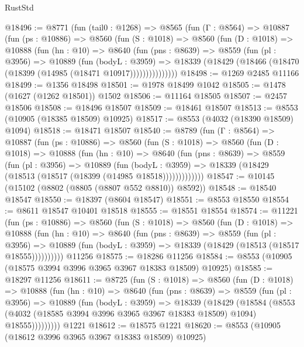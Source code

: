 \begin{lexlean}{RustStd}
\begin{coremodule}
@18496 := @8771
    (fun (tail0 : @1268) =>
    @8565
      (fun (Γ : @8564) =>
      @10887
        (fun (ps : @10886) =>
        @8560
          (fun (S : @1018) =>
          @8560
            (fun (D : @1018) =>
            @10888
              (fun (hn : @10) =>
              @8640
                (fun (pns : @8639) =>
                @8559
                  (fun (pl : @3956) =>
                  @10889
                    (fun (bodyL : @3959) =>
                    @18339 (@18429 (@18466 (@18470 (@18399 (@14985 (@18471 @10917)))))))))))))))
@18498 := @1269 @2485 @11166
@18499 := @1356 @18498
@18501 := @1978 @18499 @1042
@18505 := @1478 (@1627 (@1262 @18501)) @1502
@18506 := @11164 @18505
@18507 := @2457 @18506
@18508 := @18496 @18507
@18509 := @18461 @18507
@18513 := @8553 (@10905 (@18385 @18509) @10925)
@18517 := @8553 (@4032 (@18390 @18509) @1094)
@18518 := @18471 @18507
@18540 := @8789
    (fun (Γ : @8564) =>
    @10887
      (fun (ps : @10886) =>
      @8560
        (fun (S : @1018) =>
        @8560
          (fun (D : @1018) =>
          @10888
            (fun (hn : @10) =>
            @8640
              (fun (pns : @8639) =>
              @8559
                (fun (pl : @3956) =>
                @10889
                  (fun (bodyL : @3959) =>
                  @18339 (@18429 (@18513 (@18517 (@18399 (@14985 @18518)))))))))))))
@18547 := @10145 (@15102 (@8802 (@8805 (@8807 @552 @8810)) @8592))
@18548 := @18540 @18547
@18550 := @18397 (@8604 @18547)
@18551 := @8553 @18550
@18554 := @8611 @18547 @10401 @18518
@18555 := @18551 @18554
@18574 := @11221
    (fun (ps : @10886) =>
    @8560
      (fun (S : @1018) =>
      @8560
        (fun (D : @1018) =>
        @10888
          (fun (hn : @10) =>
          @8640
            (fun (pns : @8639) =>
            @8559
              (fun (pl : @3956) =>
              @10889 (fun (bodyL : @3959) => @18339 (@18429 (@18513 (@18517 @18555))))))))))
    @11256
@18575 := @18286 @11256
@18584 := @8553 (@10905 (@18575 @3994 @3996 @3965 @3967 @18383 @18509) @10925)
@18585 := @18297 @11256
@18611 := @8725
    (fun (S : @1018) =>
    @8560
      (fun (D : @1018) =>
      @10888
        (fun (hn : @10) =>
        @8640
          (fun (pns : @8639) =>
          @8559
            (fun (pl : @3956) =>
            @10889
              (fun (bodyL : @3959) =>
              @18339
                (@18429
                  (@18584
                    (@8553
                      (@4032 (@18585 @3994 @3996 @3965 @3967 @18383 @18509) @1094)
                      @18555)))))))))
    @1221
@18612 := @18575 @1221
@18620 := @8553 (@10905 (@18612 @3996 @3965 @3967 @18383 @18509) @10925)

\end{coremodule}
\end{lexlean}
